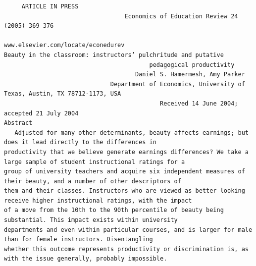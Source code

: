 \documentclass[
  shownotes,
  xcolor={svgnames},
  hyperref={colorlinks,citecolor=DarkBlue,linkcolor=DarkRed,urlcolor=DarkBlue}
  , aspectratio=169]{beamer}
\begin{document}
\begin{frame}[fragile]
\begin{tiny}
\begin{verbatim}
     ARTICLE IN PRESS
                                  Economics of Education Review 24 (2005) 369–376
                                                                                               www.elsevier.com/locate/econedurev
Beauty in the classroom: instructors’ pulchritude and putative
                                         pedagogical productivity
                                     Daniel S. Hamermesh, Amy Parker
                              Department of Economics, University of Texas, Austin, TX 78712-1173, USA
                                            Received 14 June 2004; accepted 21 July 2004
Abstract
   Adjusted for many other determinants, beauty affects earnings; but does it lead directly to the differences in
productivity that we believe generate earnings differences? We take a large sample of student instructional ratings for a
group of university teachers and acquire six independent measures of their beauty, and a number of other descriptors of
them and their classes. Instructors who are viewed as better looking receive higher instructional ratings, with the impact
of a move from the 10th to the 90th percentile of beauty being substantial. This impact exists within university
departments and even within particular courses, and is larger for male than for female instructors. Disentangling
whether this outcome represents productivity or discrimination is, as with the issue generally, probably impossible.
\end{verbatim}
\end{tiny}
\end{frame}
\end{document}
